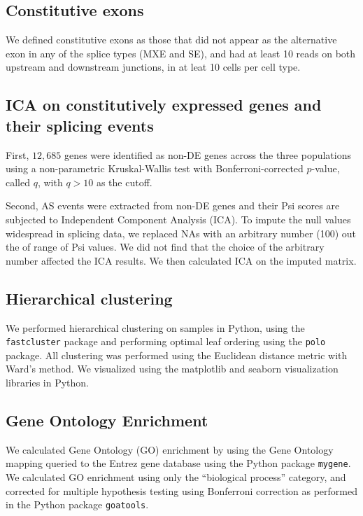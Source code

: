 \subsection{Constitutive exons}

We defined constitutive exons as those that did not appear as the alternative exon in any of the splice types (MXE and SE), and had at least 10 reads on both upstream and downstream junctions, in at leat 10 cells per cell type.

\subsection{ICA on constitutively expressed genes and their splicing events}
First, $12,685$ genes were identified as non-DE genes across the three populations using a non-parametric Kruskal-Wallis test with Bonferroni-corrected $p$-value, called $q$, with $q > 10$ as the cutoff. 

Second, AS events were extracted from non-DE genes and their Psi scores are subjected to Independent Component Analysis (ICA). To impute the null values widespread in splicing data, we replaced NAs with an arbitrary number (100) out the of range of Psi values. We did not find that the choice of the arbitrary number affected the ICA results. We then calculated ICA on the imputed matrix.

\subsection{Hierarchical clustering}

We performed hierarchical clustering on samples in Python, using the \texttt{fastcluster}\cite{Mullner:2013bl} package and performing optimal leaf ordering\cite{BarJoseph:2001tr} using the \texttt{polo}\cite{Anonymous:2FB4UNR9} package. All clustering was performed using the Euclidean distance metric with Ward's method\cite{WardJr:2012te}. We visualized using the matplotlib\cite{Anonymous:matplotlib} and seaborn\cite{Anonymous:hWlQiCz3} visualization libraries in Python.

\subsection{Gene Ontology Enrichment}
We calculated Gene Ontology (GO) enrichment by using the Gene Ontology mapping queried to the Entrez gene database using the Python package \texttt{mygene}\cite{Wu:2012bo,Xin:2016fv}. We calculated GO enrichment using only the ``biological process'' category, and corrected for multiple hypothesis testing using Bonferroni correction as performed in the Python package \texttt{goatools}\cite{Tang:2015ub}.

